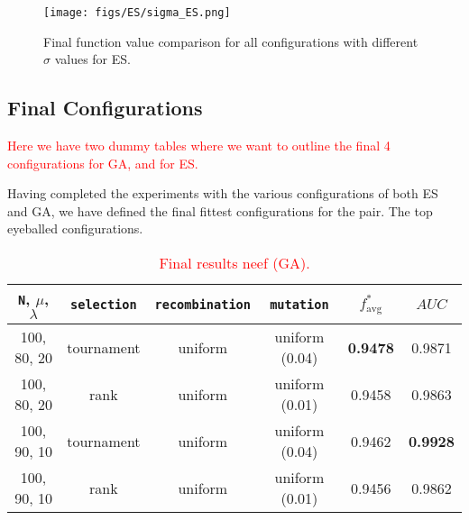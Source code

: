 \documentclass{article}
\newcommand{\todo}[1]{\textcolor{red}{#1}}
\begin{document}
\vspace{5cm}

\begin{figure*}[htbp]
    \centering
    \texttt{[image: figs/ES/sigma\_ES.png]}
    \captionsetup{width=.55\textwidth}
    \caption{
        Final function value comparison for all configurations with different $\sigma$ values for ES.
    }
    \label{fig:sigma_ES}
\end{figure*}

\newpage

\subsection*{Final Configurations}
\label{subsec:final_configs}
\todo{Here we have two dummy tables where we want to outline the final 4 configurations for GA, and for ES.}

Having completed the experiments with the various configurations of both ES and GA, we have defined the final fittest configurations for the pair. 
The top eyeballed configurations.  


\begin{table}[htbp]
    \centering
    \begin{tabular}{cccc|cc}
        \toprule
        \texttt{N}, $\mu$, $\lambda$ & \texttt{selection} & \texttt{recombination} & \texttt{mutation}
            & $f^*_{\mathrm{avg}} $ & $AUC$ \\ %
        \midrule
        100, 80, 20  &  tournament  &  uniform   &  uniform (0.04)  &  \textbf{0.9478}  &   0.9871           \\
        100, 80, 20  &  rank        &  uniform   &  uniform (0.01)  &  0.9458           &   0.9863           \\
        100, 90, 10  &  tournament  &  uniform   &  uniform (0.04)  &  0.9462           &   \textbf{0.9928}  \\
        100, 90, 10  &  rank        &  uniform   &  uniform (0.01)  &  0.9456           &   0.9862           \\
        \bottomrule
    \end{tabular}
    \vspace{0.1cm}
    \caption{\todo{Final results neef (GA).}}
    \label{tab:GA_final_configs}
\end{table}
\end{document}
